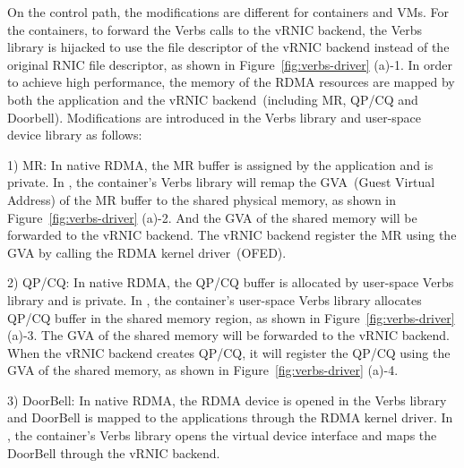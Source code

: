 On the control path, the modifications are different for containers and VMs.
For the containers, to forward the Verbs calls to the vRNIC backend, the Verbs library is hijacked to use the file descriptor of the vRNIC backend instead of the original RNIC file descriptor, as shown in Figure~\ref{fig:verbs-driver} (a)-1. In order to achieve high performance, the memory of the RDMA resources are mapped by both the application and the vRNIC backend~(including MR, QP/CQ and Doorbell). Modifications are introduced in the Verbs library and user-space device library as follows:

1) MR: In native RDMA, the MR buffer is assigned by the application and is private.
In \sys, the container's Verbs library will remap the GVA~(Guest Virtual Address) of the MR buffer to the shared physical memory, as shown in Figure~\ref{fig:verbs-driver} (a)-2. And the GVA of the shared memory will be forwarded to the vRNIC backend. The vRNIC backend register the MR using the GVA by calling the RDMA kernel driver~(OFED).

2) QP/CQ: In native RDMA, the QP/CQ buffer is allocated by user-space Verbs library and is private.
In \sys, the container's user-space Verbs library allocates QP/CQ buffer in the shared memory region, as shown in Figure~\ref{fig:verbs-driver} (a)-3. The GVA of the shared memory will be forwarded to the vRNIC backend. When the vRNIC backend creates QP/CQ, it will register the QP/CQ using the GVA of the shared memory, as shown in Figure~\ref{fig:verbs-driver} (a)-4.


3) DoorBell: In native RDMA, the RDMA device is opened in the Verbs library and DoorBell is mapped to the applications through the RDMA kernel driver.
In \sys, the container's Verbs library opens the virtual device interface and maps the DoorBell through the vRNIC backend. %


